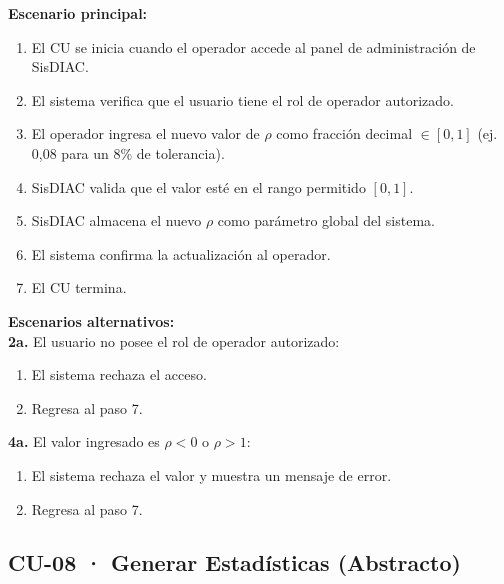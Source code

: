 \documentclass[12pt,letterpaper]{article}
\begin{document}
\noindent \textbf{Escenario principal:}
\begin{enumerate}[nosep, leftmargin=*]
	\item El CU se inicia cuando el operador accede al panel de administración de SisDIAC.
	\item El sistema verifica que el usuario tiene el rol de operador autorizado.
	\item El operador ingresa el nuevo valor de $\rho$ como fracción decimal $\in [0,1]$ (ej. 0,08 para un 8\% de tolerancia).
	\item SisDIAC valida que el valor esté en el rango permitido $[0,1]$.
	\item SisDIAC almacena el nuevo $\rho$ como parámetro global del sistema.
	\item El sistema confirma la actualización al operador.
	\item El CU termina.
\end{enumerate}

\noindent \textbf{Escenarios alternativos:} \\
\textbf{2a.} El usuario no posee el rol de operador autorizado:
\begin{enumerate}[nosep]
	\item[2a1.] El sistema rechaza el acceso.
	\item[2a2.] Regresa al paso 7.
\end{enumerate}
\textbf{4a.} El valor ingresado es $\rho < 0$ o $\rho > 1$:
\begin{enumerate}[nosep]
	\item[4a1.] El sistema rechaza el valor y muestra un mensaje de error.
	\item[4a2.] Regresa al paso 7.
\end{enumerate}

\newpage
\subsection{CU-08 · Generar Estadísticas (Abstracto)}
\end{document}
